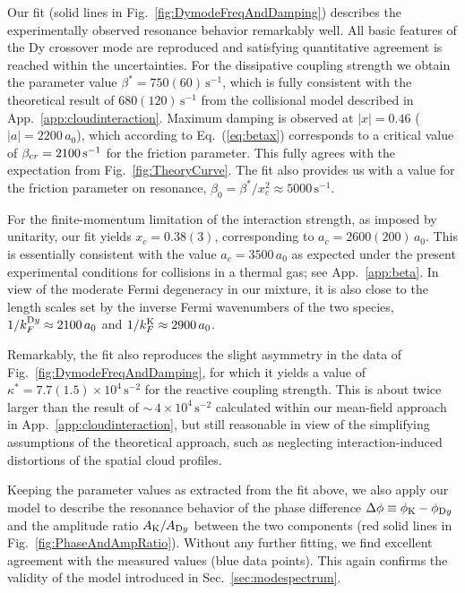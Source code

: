 Our fit (solid lines in Fig.~\ref{fig:DymodeFreqAndDamping}) describes the experimentally observed resonance behavior remarkably well. All basic features of the Dy crossover mode are reproduced and satisfying quantitative agreement is reached within the uncertainties. For the dissipative coupling strength we obtain the parameter value  $\beta^* =  750(60)\,\mathrm{s}^{-1}$, which is fully consistent with the theoretical result of $680(120)\,\mathrm{s}^{-1}$  from the collisional model described in App.~\ref{app:cloudinteraction}. Maximum damping is observed at $|x| = 0.46$ ($|a|= 2200\,a_0$), which according to Eq.~(\ref{eq:betax}) corresponds to a critical value of $\beta_{\textrm cr} = 2100\,\textrm{s}^{-1}$ for the friction parameter. This fully agrees with the expectation from Fig.~\ref{fig:TheoryCurve}. The fit also provides us with a value for the friction parameter on resonance, $\beta_0 = \beta^*/x_c^2 \approx 5000\,\textrm{s}^{-1}$. 

For the finite-momentum limitation of the interaction strength, as imposed by unitarity, our fit yields $x_c = 0.38(3)$, corresponding to $a_c = 2600(200)\,a_0$. This is essentially consistent with the value $a_c = 3500\,a_0$ as expected under the present experimental conditions for collisions in a thermal gas; see App.~\ref{app:beta}. In view of the moderate Fermi degeneracy in our mixture, it is also close to the
length scales set by the inverse Fermi wavenumbers of the two species, $1/k_F^{\textrm Dy} \approx 2100 \,a_0$ and $1/k_F^{\textrm K} \approx 2900 \,a_0$.

Remarkably, the fit also reproduces the slight asymmetry in the data of Fig.~\ref{fig:DymodeFreqAndDamping}, for which it yields a value of $\kappa^* = 7.7(1.5)\times 10^4\,\textrm{s}^{-2}$ for the reactive coupling strength. This is about twice larger than the result of $\sim\,4 \times 10^4\,\textrm{s}^{-2}$ calculated within our mean-field approach in App.~\ref{app:cloudinteraction}, but still reasonable in view of the simplifying assumptions of the theoretical approach, such as neglecting interaction-induced distortions of the spatial cloud profiles.

Keeping the parameter values as extracted from the fit above, we also apply our model to describe the resonance behavior of the phase difference 
$\Delta\phi \equiv \phi_{\textrm K}-\phi_{\textrm Dy}$ 
and the amplitude ratio $A_{\textrm K}/A_{\textrm Dy}$  between the two components (red solid lines in Fig.~\ref{fig:PhaseAndAmpRatio}). Without any further fitting, we find excellent agreement with the measured values (blue data points). This  again confirms the validity of the model introduced in Sec.~\ref{sec:modespectrum}.

